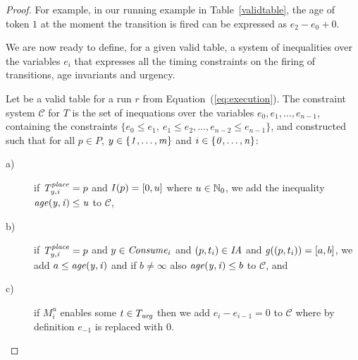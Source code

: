 \begin{proof}
For example, in our running example in Table~\ref{validtable},
the age of token $1$ at the moment the transition  is fired
can be expressed as $e_2 - e_0 + 0$.



We are now ready to define, for a given valid table, a system of inequalities
over the variables $e_i$ that expresses all the timing constraints on the 
firing of transitions, age invariants and urgency.
 
\begin{definition}\label{def:consys}
Let  be a valid table for a run $r$ from
Equation~(\ref{eq:execution}). The constraint system $\mathscr{C}$ for $T$ 
is the set of inequations over the variables
$e_0, e_1, \ldots, e_{n-1}$, containing the constraints 
$\{ e_0 \leq e_1,\ e_1 \leq e_2, \ldots, e_{n-2} \leq e_{n-1}\}$, 
and constructed 
such that for all $p \in P$, $y \in {\mathit{\{1,\ldots,m\}}}$ and $i \in {\mathit{\{0,\ldots,n\}}}$:
\begin{description}
\item[a)] if ${\mathit{T^{\mathit{place}}_{y,i}}}=p$ and $\mathit{I}(p)=[0,u]$ where $u \in \mathbb{N}_{0}$, 
we add the inequality ${\mathit{age(y,i)\leq u}}$ to $\mathscr{C}$,
\item[b)] if ${\mathit{T^{\mathit{place}}_{y,i}}}=p$ and $y \in {\mathit{Consume_i}}$ and $(p,t_i) \in \mathit{IA}$ and $\mathit{g}((p,t_i))=[a,b]$, we add $a \leq {\mathit{age({y,i})}}$ and if $b \not=\infty$ also 
${\mathit{age({y,i})}}\leq b$ to $\mathscr{C}$, and
\item[c)] if $M^u_i$ enables some $t \in T_{\mathit{urg}}$
then we add $e_i - e_{i-1} = 0$ to $\mathscr{C}$
where by definition $e_{-1}$ is replaced with $0$.
\end{description}
\end{definition}


\end{proof}
